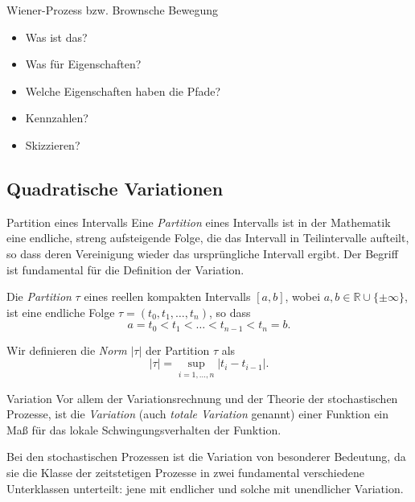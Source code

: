 \begin{info}{Wiener-Prozess bzw. Brownsche Bewegung}
    \begin{itemize}
        \item Was ist das?
        \item Was für Eigenschaften?
        \item Welche Eigenschaften haben die Pfade?
        \item Kennzahlen?
        \item Skizzieren?
    \end{itemize}
\end{info}

\subsection{Quadratische Variationen}

\begin{defi}{Partition eines Intervalls}
    Eine \emph{Partition} eines Intervalls ist in der Mathematik eine endliche, streng aufsteigende Folge, die das Intervall in Teilintervalle aufteilt, so dass deren Vereinigung wieder das ursprüngliche Intervall ergibt.
    Der Begriff ist fundamental für die Definition der Variation.

    Die \emph{Partition} $\tau$ eines reellen kompakten Intervalls $[a, b]$, wobei $a,b\in \mathbb{R} \cup \{\pm \infty \}$, ist eine endliche Folge $\tau=(t_{0},t_{1},\dots ,t_{n})$, so dass
    \[
        a = t_0 < t_1 < \dots < t_{n-1} < t_n = b.
    \]

    Wir definieren die \emph{Norm} $|\tau|$ der Partition $\tau$ als
    \[
        |\tau| = \sup_{i=1,\dots,n} |t_i - t_{i-1}|.
    \]
\end{defi}

\begin{defi}{Variation}
    Vor allem der Variationsrechnung und der Theorie der stochastischen Prozesse, ist die \emph{Variation} (auch \emph{totale Variation} genannt) einer Funktion ein Maß für das lokale Schwingungsverhalten der Funktion.

    Bei den stochastischen Prozessen ist die Variation von besonderer Bedeutung, da sie die Klasse der zeitstetigen Prozesse in zwei fundamental verschiedene Unterklassen unterteilt:
    jene mit endlicher und solche mit unendlicher Variation.
\end{defi}

